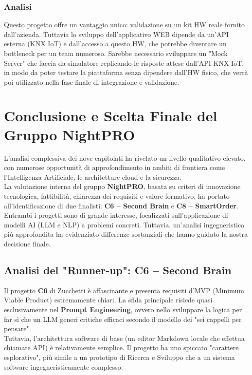 \documentclass[a4paper, 11pt, oneside]{scrartcl} %
\begin{document}
\subsubsection*{Analisi}
Questo progetto offre un vantaggio unico: validazione su un kit HW reale fornito dall'azienda. Tuttavia lo sviluppo dell'applicativo WEB dipende da un'API esterna (KNX IoT) e dall'accesso a questo HW, che potrebbe diventare un bottleneck per un team numeroso. Sarebbe necessario sviluppare un "Mock Server" che faccia da simulatore replicando le risposte attese dall'API KNX IoT, in modo da poter testare la piattaforma senza dipendere dall'HW fisico, che verrà poi utilizzato nella fase finale di integrazione e validazione.


\section{Conclusione e Scelta Finale del Gruppo NightPRO}

L'analisi complessiva dei nove capitolati ha rivelato un livello qualitativo elevato, con numerose opportunità di approfondimento in ambiti di frontiera come l'Intelligenza Artificiale, le architetture cloud e la sicurezza.
\\[0.6em]
La valutazione interna del gruppo \textbf{NightPRO}, basata su criteri di innovazione tecnologica, fattibilità, chiarezza dei requisiti e valore formativo, ha portato all'identificazione di due finalisti: \textbf{C6 – Second Brain} e \textbf{C8 – SmartOrder}.
\\[0.6em]
Entrambi i progetti sono di grande interesse, focalizzati sull'applicazione di modelli AI (LLM e NLP) a problemi concreti. Tuttavia, un'analisi ingegneristica più approfondita ha evidenziato differenze sostanziali che hanno guidato la nostra decisione finale.

\subsection*{Analisi del "Runner-up": C6 – Second Brain}

Il progetto \textbf{C6} di Zucchetti è affascinante e presenta requisiti d'MVP (Minimum Viable Product) estremamente chiari. La sfida principale risiede quasi esclusivamente nel \textbf{Prompt Engineering}, ovvero nello sviluppare la logica per far sì che un LLM generi critiche efficaci secondo il modello dei "sei cappelli per pensare".
\\[0.6em]
Tuttavia, l'architettura software di base (un editor Markdown locale che effettua chiamate API) è relativamente semplice. Il progetto ha uno spiccato "carattere esplorativo", più simile a un prototipo di Ricerca e Sviluppo che a un sistema software ingegneristicamente complesso.
\end{document}

